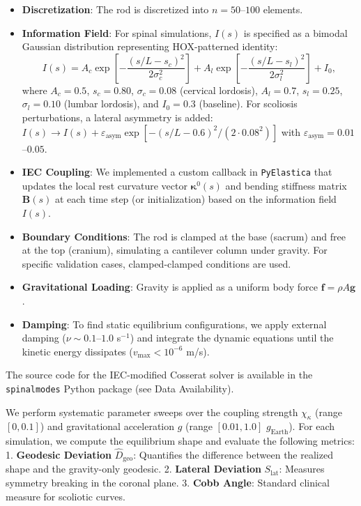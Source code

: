 \documentclass[11pt]{article}
\begin{document}
\begin{itemize}
    \item \textbf{Discretization}: The rod is discretized into $n=50$--$100$ elements.
    \item \textbf{Information Field}: For spinal simulations, $I(s)$ is specified as a bimodal Gaussian distribution representing HOX-patterned identity:
    \begin{equation}
    I(s) = A_c \exp\left[-\frac{(s/L - s_c)^2}{2\sigma_c^2}\right] + A_l \exp\left[-\frac{(s/L - s_l)^2}{2\sigma_l^2}\right] + I_0,
    \label{eq:info_field_spinal}
    \end{equation}
    where $A_c = 0.5$, $s_c = 0.80$, $\sigma_c = 0.08$ (cervical lordosis), $A_l = 0.7$, $s_l = 0.25$, $\sigma_l = 0.10$ (lumbar lordosis), and $I_0 = 0.3$ (baseline). For scoliosis perturbations, a lateral asymmetry is added: $I(s) \to I(s) + \varepsilon_{\mathrm{asym}} \exp[-(s/L - 0.6)^2/(2 \cdot 0.08^2)]$ with $\varepsilon_{\mathrm{asym}} = 0.01$--$0.05$.
    \item \textbf{IEC Coupling}: We implemented a custom callback in \texttt{PyElastica} that updates the local rest curvature vector $\bm{\kappa}^0(s)$ and bending stiffness matrix $\mathbf{B}(s)$ at each time step (or initialization) based on the information field $I(s)$.
    \item \textbf{Boundary Conditions}: The rod is clamped at the base (sacrum) and free at the top (cranium), simulating a cantilever column under gravity. For specific validation cases, clamped-clamped conditions are used.
    \item \textbf{Gravitational Loading}: Gravity is applied as a uniform body force $\mathbf{f} = \rho A \mathbf{g}$.
    \item \textbf{Damping}: To find static equilibrium configurations, we apply external damping ($\nu \sim 0.1$--$1.0$ s$^{-1}$) and integrate the dynamic equations until the kinetic energy dissipates ($v_{\max} < 10^{-6}$ m/s).
\end{itemize}

The source code for the IEC-modified Cosserat solver is available in the \texttt{spinalmodes} Python package (see Data Availability).



We perform systematic parameter sweeps over the coupling strength $\chi_\kappa$ (range $[0, 0.1]$) and gravitational acceleration $g$ (range $[0.01, 1.0]$ $g_{\mathrm{Earth}}$). For each simulation, we compute the equilibrium shape and evaluate the following metrics:
1.  \textbf{Geodesic Deviation} $\widehat{D}_{\mathrm{geo}}$: Quantifies the difference between the realized shape and the gravity-only geodesic.
2.  \textbf{Lateral Deviation} $S_{\mathrm{lat}}$: Measures symmetry breaking in the coronal plane.
3.  \textbf{Cobb Angle}: Standard clinical measure for scoliotic curves.
\end{document}
